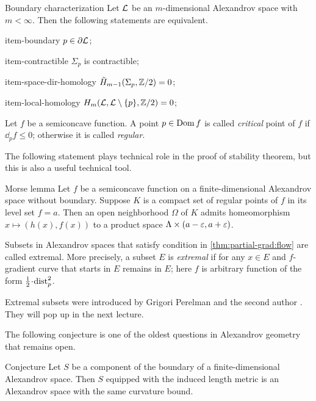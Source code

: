 \begin{thm}{Boundary characterization}
Let $\mathcal{L}$ be an $m$-dimensional Alexandrov space with $m<\infty$.
Then the following statements are equivalent.

\begin{subthm}{item-boundary} $p\in \partial \mathcal{L}$;
\end{subthm}

\begin{subthm}{item-contractible} $\Sigma_p$ is contractible;
\end{subthm}

\begin{subthm}{item-space-dir-homology} $\tilde H_{m-1}(\Sigma_p,\mathbb{Z}/2)= 0$;
\end{subthm}

\begin{subthm}{item-local-homology} $H_m(\mathcal{L},\mathcal{L}\setminus \{p\},\mathbb{Z}/2)= 0$;
\end{subthm}

\end{thm}

Let $f$ be a semiconcave function.
A point $p\in \mathop{\rm Dom}\nolimits f$ is called \emph{critical} point of $f$ if $\dd_pf\le 0$; 
otherwise it is called \emph{regular}.

The following statement plays technical role in the proof of stability theorem,
but this is also a useful technical tool.

\begin{thm}{Morse lemma}
Let $f$ be a semiconcave function on a finite-dimensional Alexandrov space without boundary.
Suppose $K$ is a compact set of regular points of $f$ in its level set $f=a$.
Then an open neighborhood $\Omega$ of $K$ admits homeomorphism $x\mapsto (h(x),f(x))$ to a product space $\Lambda\times (a-\varepsilon,a+\varepsilon)$.
\end{thm}

Subsets in Alexandrov spaces that satisfy condition in \ref{thm:partial-grad:flow} are called extremal.
More precisely, a subset $E$ is \emph{extremal} if for any $x\in E$
and $f$-gradient curve that starts in $E$ remains in $E$;
here $f$ is arbitrary function of the form $\tfrac12\cdot \distfun_p^2$.

Extremal subsets were introduced by Grigori Perelman and the second author \cite{perelman-petrunin}.
They will pop up in the next lecture.

The following conjecture is one of the oldest questions in Alexandrov geometry that remains open.

\begin{thm}{Conjecture}
Let $S$ be a component of the boundary of a finite-dimensional Alexandrov space.
Then $S$ equipped with the induced length metric is an Alexandrov space with the same curvature bound.
\end{thm}


